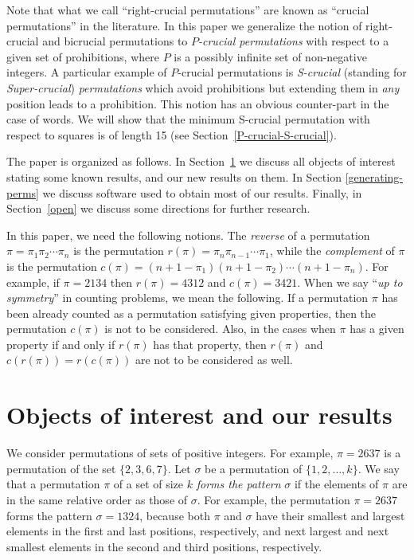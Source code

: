 \documentclass[12pt,reqno]{article}
\begin{document}
Note that what we call ``right-crucial permutations'' are known as ``crucial permutations'' in the literature. In this paper we generalize the notion of  right-crucial and bicrucial permutations to {\em $P$-crucial permutations} with respect to a given set of prohibitions, where $P$ is a possibly infinite set of non-negative integers. A particular example of $P$-crucial permutations is {\em S-crucial} (standing for {\em Super-crucial}) {\em permutations} which avoid prohibitions but extending them in {\em any} position leads to a prohibition. This notion has an obvious counter-part in the case of words. We will show that the minimum S-crucial permutation with respect to squares is of length 15 (see Section~\ref{P-crucial-S-crucial}).

The paper is organized as follows. In Section~\ref{sec2}  we discuss all objects of interest stating some known results, and our new results on them. In Section \ref{generating-perms} we discuss software used to obtain most of our results. Finally, in Section~\ref{open}  we discuss some directions for further research.  

In this paper, we need the following notions. The {\em reverse} of a permutation $\pi=\pi_1\pi_2\cdots \pi_n$ is the permutation $r(\pi)=\pi_n\pi_{n-1}\cdots\pi_1$, while the {\em complement} of $\pi$ is the permutation $c(\pi)=(n+1-\pi_1)(n+1-\pi_2)\cdots (n+1-\pi_n)$. For example, if $\pi=2134$ then $r(\pi)=4312$ and $c(\pi)=3421$. When we say ``{\em up to symmetry}'' in counting problems, we mean the following. If a permutation $\pi$ has been already counted as a permutation satisfying given properties, then the permutation $c(\pi)$ is not to be considered. Also, in the cases when $\pi$ has a given property if and only if $r(\pi)$ has that property, then $r(\pi)$ and $c(r(\pi))=r(c(\pi))$ are not to be considered as well.  

\section{Objects of interest and our results}\label{sec2}

We consider permutations of sets of positive integers. For example, $\pi=2637$ is a permutation of the set $\{2,3,6,7\}$. Let $\sigma$ be a permutation of $\{1,2,\ldots,k\}$. We say that a permutation $\pi$ of a set of size $k$ {\em forms the pattern} $\sigma$ if the elements of $\pi$ are in the same relative order as those of $\sigma$. For example, the permutation $\pi=2637$ forms the pattern $\sigma=1324$, because both $\pi$ and $\sigma$ have their smallest and largest elements in the first and last positions, respectively, and next largest and next smallest elements in the second and third positions, respectively. 
\end{document}
